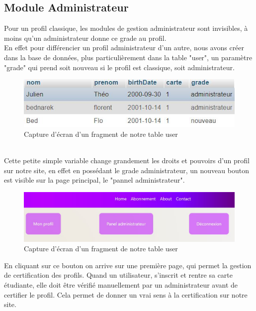 \documentclass[12pt]{report}
\begin{document}
\subsection{Module Administrateur}
Pour un profil classique, les modules de gestion administrateur sont invisibles, à moins qu'un administrateur donne ce grade au profil.\\
En effet pour différencier un profil administrateur d'un autre, nous avons créer dans la base de données, plus particulièrement dans la table "user", un paramètre "grade" qui prend soit nouveau si le profil est classique, soit administrateur.\\
\begin{figure}[h!]
	\begin{center}
		\includegraphics[scale=1.2]{fragBDD.jpg}
	\end{center}
		\caption{Capture d'écran d'un fragment de notre table user}
\end{figure}\\
Cette petite simple variable change grandement les droits et pouvoirs d'un profil sur notre site, en effet en possédant le grade administrateur, un nouveau bouton est visible sur la page principal, le "pannel administrateur".
\begin{figure}[h!]
	\begin{center}
		\includegraphics[scale=0.8]{boutonpanel.jpg}
	\end{center}
		\caption{Capture d'écran d'un fragment de notre table user}
\end{figure}
\clearpage
En cliquant sur ce bouton on arrive sur une première page, qui permet la gestion de certification des profils. Quand un utilisateur, s'inscrit et rentre sa carte étudiante, elle doit être vérifié manuellement par un administrateur avant de certifier le profil. Cela permet de donner un vrai sens à la certification sur notre site.\\
\end{document}
